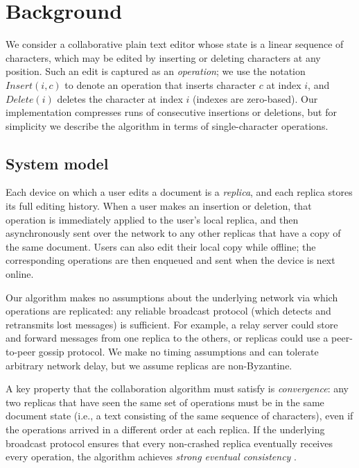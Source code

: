 \documentclass[sigplan,10pt]{acmart}
\begin{document}
\section{Background}

We consider a collaborative plain text editor whose state is a linear sequence of characters, which may be edited by inserting or deleting characters at any position.
Such an edit is captured as an \emph{operation}; we use the notation $\mathit{Insert}(i, c)$ to denote an operation that inserts character $c$ at index $i$, and $\mathit{Delete}(i)$ deletes the character at index $i$ (indexes are zero-based).
Our implementation compresses runs of consecutive insertions or deletions, but for simplicity we describe the algorithm in terms of single-character operations.

\subsection{System model}

Each device on which a user edits a document is a \emph{replica}, and each replica stores its full editing history.
When a user makes an insertion or deletion, that operation is immediately applied to the user's local replica, and then asynchronously sent over the network to any other replicas that have a copy of the same document.
Users can also edit their local copy while offline; the corresponding operations are then enqueued and sent when the device is next online.

Our algorithm makes no assumptions about the underlying network via which operations are replicated: any reliable broadcast protocol (which detects and retransmits lost messages) is sufficient.
For example, a relay server could store and forward messages from one replica to the others, or replicas could use a peer-to-peer gossip protocol.
We make no timing assumptions and can tolerate arbitrary network delay, but we assume replicas are non-Byzantine.

A key property that the collaboration algorithm must satisfy is \emph{convergence}: any two replicas that have seen the same set of operations must be in the same document state (i.e., a text consisting of the same sequence of characters), even if the operations arrived in a different order at each replica.
If the underlying broadcast protocol ensures that every non-crashed replica eventually receives every operation, the algorithm achieves \emph{strong eventual consistency} \cite{Shapiro2011}.
\end{document}
